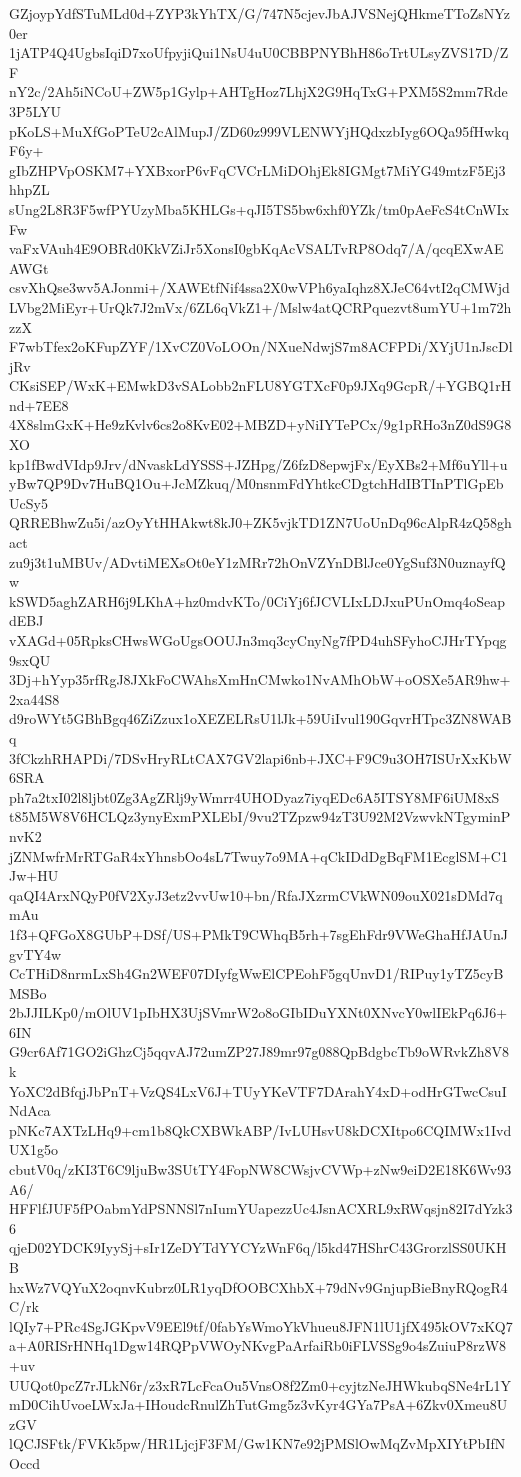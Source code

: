 GZjoypYdfSTuMLd0d+ZYP3kYhTX/G/747N5cjevJbAJVSNejQHkmeTToZsNYz0er
1jATP4Q4UgbsIqiD7xoUfpyjiQui1NsU4uU0CBBPNYBhH86oTrtULsyZVS17D/ZF
nY2c/2Ah5iNCoU+ZW5p1Gylp+AHTgHoz7LhjX2G9HqTxG+PXM5S2mm7Rde3P5LYU
pKoLS+MuXfGoPTeU2cAlMupJ/ZD60z999VLENWYjHQdxzbIyg6OQa95fHwkqF6y+
gIbZHPVpOSKM7+YXBxorP6vFqCVCrLMiDOhjEk8IGMgt7MiYG49mtzF5Ej3hhpZL
sUng2L8R3F5wfPYUzyMba5KHLGs+qJI5TS5bw6xhf0YZk/tm0pAeFcS4tCnWIxFw
vaFxVAuh4E9OBRd0KkVZiJr5XonsI0gbKqAcVSALTvRP8Odq7/A/qcqEXwAEAWGt
csvXhQse3wv5AJonmi+/XAWEtfNif4ssa2X0wVPh6yaIqhz8XJeC64vtI2qCMWjd
LVbg2MiEyr+UrQk7J2mVx/6ZL6qVkZ1+/Mslw4atQCRPquezvt8umYU+1m72hzzX
F7wbTfex2oKFupZYF/1XvCZ0VoLOOn/NXueNdwjS7m8ACFPDi/XYjU1nJscDljRv
CKsiSEP/WxK+EMwkD3vSALobb2nFLU8YGTXcF0p9JXq9GcpR/+YGBQ1rHnd+7EE8
4X8slmGxK+He9zKvlv6cs2o8KvE02+MBZD+yNiIYTePCx/9g1pRHo3nZ0dS9G8XO
kp1fBwdVIdp9Jrv/dNvaskLdYSSS+JZHpg/Z6fzD8epwjFx/EyXBs2+Mf6uYll+u
yBw7QP9Dv7HuBQ1Ou+JcMZkuq/M0nsnmFdYhtkcCDgtchHdIBTInPTlGpEbUcSy5
QRREBhwZu5i/azOyYtHHAkwt8kJ0+ZK5vjkTD1ZN7UoUnDq96cAlpR4zQ58ghact
zu9j3t1uMBUv/ADvtiMEXsOt0eY1zMRr72hOnVZYnDBlJce0YgSuf3N0uznayfQw
kSWD5aghZARH6j9LKhA+hz0mdvKTo/0CiYj6fJCVLIxLDJxuPUnOmq4oSeapdEBJ
vXAGd+05RpksCHwsWGoUgsOOUJn3mq3cyCnyNg7fPD4uhSFyhoCJHrTYpqg9sxQU
3Dj+hYyp35rfRgJ8JXkFoCWAhsXmHnCMwko1NvAMhObW+oOSXe5AR9hw+2xa44S8
d9roWYt5GBhBgq46ZiZzux1oXEZELRsU1lJk+59UiIvul190GqvrHTpc3ZN8WABq
3fCkzhRHAPDi/7DSvHryRLtCAX7GV2lapi6nb+JXC+F9C9u3OH7ISUrXxKbW6SRA
ph7a2txI02l8ljbt0Zg3AgZRlj9yWmrr4UHODyaz7iyqEDc6A5ITSY8MF6iUM8xS
t85M5W8V6HCLQz3ynyExmPXLEbI/9vu2TZpzw94zT3U92M2VzwvkNTgyminPnvK2
jZNMwfrMrRTGaR4xYhnsbOo4sL7Twuy7o9MA+qCkIDdDgBqFM1EcglSM+C1Jw+HU
qaQI4ArxNQyP0fV2XyJ3etz2vvUw10+bn/RfaJXzrmCVkWN09ouX021sDMd7qmAu
1f3+QFGoX8GUbP+DSf/US+PMkT9CWhqB5rh+7sgEhFdr9VWeGhaHfJAUnJgvTY4w
CcTHiD8nrmLxSh4Gn2WEF07DIyfgWwElCPEohF5gqUnvD1/RIPuy1yTZ5cyBMSBo
2bJJILKp0/mOlUV1pIbHX3UjSVmrW2o8oGIbIDuYXNt0XNvcY0wlIEkPq6J6+6IN
G9cr6Af71GO2iGhzCj5qqvAJ72umZP27J89mr97g088QpBdgbcTb9oWRvkZh8V8k
YoXC2dBfqjJbPnT+VzQS4LxV6J+TUyYKeVTF7DArahY4xD+odHrGTwcCsuINdAca
pNKc7AXTzLHq9+cm1b8QkCXBWkABP/IvLUHsvU8kDCXItpo6CQIMWx1IvdUX1g5o
cbutV0q/zKI3T6C9ljuBw3SUtTY4FopNW8CWsjvCVWp+zNw9eiD2E18K6Wv93A6/
HFFlfJUF5fPOabmYdPSNNSl7nIumYUapezzUc4JsnACXRL9xRWqsjn82I7dYzk36
qjeD02YDCK9IyySj+sIr1ZeDYTdYYCYzWnF6q/l5kd47HShrC43GrorzlSS0UKHB
hxWz7VQYuX2oqnvKubrz0LR1yqDfOOBCXhbX+79dNv9GnjupBieBnyRQogR4C/rk
lQIy7+PRc4SgJGKpvV9EEl9tf/0fabYsWmoYkVhueu8JFN1lU1jfX495kOV7xKQ7
a+A0RISrHNHq1Dgw14RQPpVWOyNKvgPaArfaiRb0iFLVSSg9o4sZuiuP8rzW8+uv
UUQot0pcZ7rJLkN6r/z3xR7LcFcaOu5VnsO8f2Zm0+cyjtzNeJHWkubqSNe4rL1Y
mD0CihUvoeLWxJa+IHoudcRnulZhTutGmg5z3vKyr4GYa7PsA+6Zkv0Xmeu8UzGV
lQCJSFtk/FVKk5pw/HR1LjcjF3FM/Gw1KN7e92jPMSlOwMqZvMpXIYtPbIfNOccd
